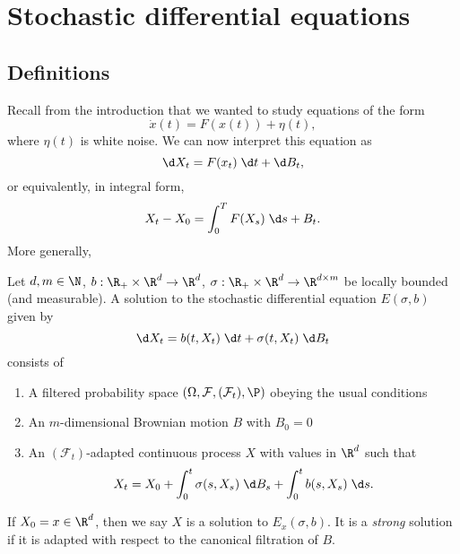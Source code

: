 \documentclass[a4paper]{article}
\begin{document}
\section{Stochastic differential equations}
\subsection{Definitions}
Recall from the introduction that we wanted to study equations of the form
\[
  \dot{x}(t) = F(x(t)) + \eta(t),
\]
where $\eta(t)$ is white noise. We can now interpret this equation as
\[
  \d X_t = F(x_t)\;\d t + \d B_t,
\]
or equivalently, in integral form,
\[
  X_t - X_0 = \int_0^T F(X_s) \;\d s+ B_t.
\]
More generally,
\begin{defi}
  Let $d, m \in \N$, $b:\R_+ \times \R^d \to \R^d$, $\sigma: \R_+ \times \R^d \to \R^{d \times m}$ be locally bounded (and measurable). A solution to the stochastic differential equation $E(\sigma, b)$ given by
  \[
    \d X_t = b(t, X_t) \;\d t + \sigma(t, X_t) \;\d B_t
  \]
  consists of
  \begin{enumerate}
    \item A filtered probability space $(\Omega, \mathcal{F}, (\mathcal{F}_t), \P)$ obeying the usual conditions
    \item An $m$-dimensional Brownian motion $B$ with $B_0 = 0$
    \item An $(\mathcal{F}_t)$-adapted continuous process $X$ with values in $\R^d$ such that
      \[
        X_t = X_0 + \int_0^t \sigma(s, X_s) \;\d B_s + \int_0^t b(s, X_s) \;\d s.
      \]
  \end{enumerate}
  If $X_0 = x \in \R^d$, then we say $X$ is a solution to $E_x(\sigma, b)$. It is a \emph{strong} solution if it is adapted with respect to the canonical filtration of $B$.
\end{defi}
\end{document}
